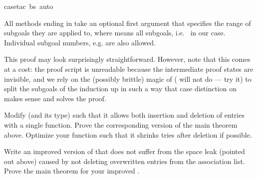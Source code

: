 \begin{isabellebody}
case{\isacharunderscore}tac{\isacharbrackleft}{\isacharbang}{\isacharbrackright}\ bs{\isacharcomma}\ auto{\isacharparenright}\isanewline
\isamarkupfalse%
\isamarkupfalse%
%
\begin{isamarkuptext}%
\noindent
{}%
All methods ending in  take an optional first argument that
specifies the range of subgoals they are applied to, where \isa{{\isacharbrackleft}{\isacharbang}{\isacharbrackright}} means
all subgoals, i.e.\  in our case. Individual subgoal numbers,
e.g.  are also allowed.

This proof may look surprisingly straightforward. However, note that this
comes at a cost: the proof script is unreadable because the intermediate
proof states are invisible, and we rely on the (possibly brittle) magic of
 ( will not do --- try it) to split the subgoals
of the induction up in such a way that case distinction on  makes
sense and solves the proof. 

\begin{exercise}
  Modify  (and its type) such that it allows both insertion and
  deletion of entries with a single function.  Prove the corresponding version 
  of the main theorem above.
  Optimize your function such that it shrinks tries after
  deletion if possible.
\end{exercise}

\begin{exercise}
  Write an improved version of  that does not suffer from the
  space leak (pointed out above) caused by not deleting overwritten entries
  from the association list. Prove the main theorem for your improved
  .
\end{exercise}


\end{isamarkuptext}
\end{isabellebody}
